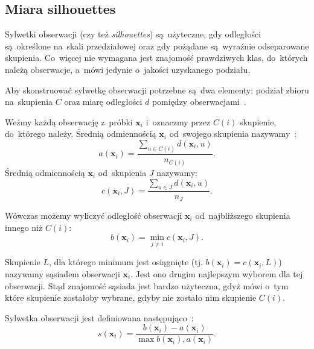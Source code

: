 \documentclass{praca1}
\begin{document}
\subsection{Miara silhouettes}

Sylwetki obserwacji (czy też \emph{silhouettes}) są~użyteczne, gdy odległości są~określone na~skali przedziałowej oraz gdy pożądane są~wyraźnie odseparowane skupienia. Co~więcej nie wymagana jest znajomość prawdziwych klas, do~których należą obserwacje, a~mówi jedynie o~jakości uzyskanego podziału.

Aby skonstruować sylwetkę obserwacji potrzebne są~dwa elementy: podział zbioru na~skupienia $C$ oraz miarę odległości $d$ pomiędzy obserwacjami~\cite{Rousseeuw1987:silhoutte}.

\begin{definition}
Weźmy każdą obserwację z~próbki $\mathbf{x}_i$ i~oznaczmy przez $C(i)$ skupienie, do~którego należy. Średnią odmiennością $\mathbf{x}_i$ od~swojego skupienia nazywamy~\cite{Rousseeuw1987:silhoutte}:
\begin{equation*}
a(\mathbf{x}_i) = \frac{\sum_{u \in C(i)} d(\mathbf{x}_i, u)}{n_{C(i)}}.
\end{equation*}
Średnią odmiennością $\mathbf{x}_i$ od~skupienia $J$ nazywamy:
\begin{equation*}
c(\mathbf{x}_i, J) = \frac{\sum_{u \in J} d(\mathbf{x}_i, u)}{n_{J}}.
\end{equation*}
\end{definition}
Wówczas możemy wyliczyć odległość obserwacji $\mathbf{x}_i$ od~najbliższego skupienia innego niż $C(i)$:
\begin{equation*}
b(\mathbf{x}_i) = \min\limits_{j \neq i} c(\mathbf{x}_i, J).
\end{equation*}


Skupienie $L$, dla którego minimum jest osiągnięte (tj. $b(\mathbf{x}_i) = c(\mathbf{x}_i, L)$) nazywamy sąsiadem obserwacji $\mathbf{x}_i$. Jest ono drugim najlepszym wyborem dla tej obserwacji. Stąd znajomość sąsiada jest bardzo użyteczna, gdyż mówi o~tym które skupienie zostałoby wybrane, gdyby nie zostało nim skupienie $C(i)$.

\begin{definition}
Sylwetka obserwacji jest definiowana następująco~\cite{Rousseeuw1987:silhoutte}:
\begin{equation*}
s(\mathbf{x}_i) = \frac{b(\mathbf{x}_i) - a(\mathbf{x}_i)}{\max{b(\mathbf{x}_i), a(\mathbf{x}_i)}}.
\end{equation*}
\end{definition}
\end{document}
